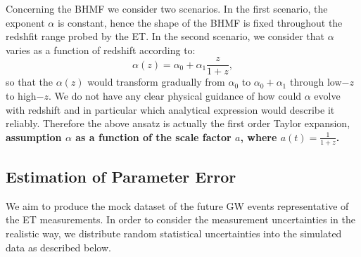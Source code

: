 \documentclass[twocolumn]{aastex62}
\newcommand{\kai}[1]{\textcolor{red}{[{\bf Kai}: #1]}}
\begin{document}
Concerning the BHMF we consider two scenarios. In the first scenario, the exponent $\alpha$ is constant, hence the shape of the BHMF is fixed throughout the redshfit range probed by the ET. In the second scenario, we consider that $\alpha$ varies as a function of redshift according to:
 \begin{equation} \label{equ_alphaz}
\alpha(z) = \alpha_0 + \alpha_1\frac{z}{1+z} , 
 \end{equation}
so that the $\alpha(z)$ would transform gradually from $\alpha_0$ to $\alpha_0+\alpha_1$ through low$-z$ to high$-z$. We do not have any clear physical guidance of how could $\alpha$ evolve  with redshift and in particular which analytical expression would describe it reliably. Therefore the above ansatz is actually the first order Taylor expansion{, \bf assumption $\alpha$ as a function of the scale factor $a$, where $a(t) = \frac{1}{1+z}$.} 

\subsection{Estimation of Parameter Error} \label{sec_noiselevel}
We aim to produce the mock dataset of the future GW events representative of the ET  measurements. In order to consider the measurement uncertainties in the realistic way, we distribute random statistical uncertainties into the simulated data as described below.
\end{document}
